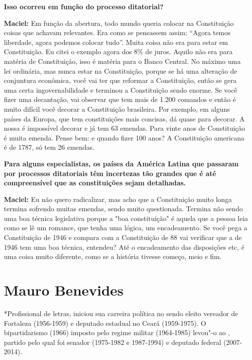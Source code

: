 \textbf{Isso ocorreu em função do processo ditatorial?}

\textbf{Maciel:} Em função da abertura, todo mundo queria colocar na
Constituição coisas que achavam relevantes. Era como se pensassem assim:
``Agora temos liberdade, agora podemos colocar tudo''. Muita coisa não
era para estar em Constituição. Eu citei o exemplo agora dos 8\% de
juros. Aquilo não era para matéria de Constituição, isso é matéria para
o Banco Central. No máximo uma lei ordinária, mas nunca estar na
Constituição, porque se há uma alteração de conjuntura econômica, você
vai ter que reformar a Constituição, então se gera uma certa
ingovernabilidade e terminou a Constituição sendo enorme. Se você fizer
uma decantação, vai observar que tem mais de 1.200 comandos e então é
muito difícil você decorar a Constituição brasileira. Por exemplo, em
alguns países da Europa, que tem constituições mais concisas, dá quase
para decorar. A nossa é impossível decorar e já tem 63 emendas. Para
vinte anos de Constituição é muita emenda. Pense bem: e quando fizer 100
anos? A Constituição americana é de 1787, só tem 26 emendas.

\textbf{Para alguns especialistas, os países da América Latina que
passaram por processos ditatoriais têm incertezas tão grandes que é até
compreensível que as constituições sejam detalhadas.}

\textbf{Maciel:} Eu não quero radicalizar, mas acho que a Constituição
muito longa termina sofrendo muitas emendas, sendo muito questionada.
Termina não sendo uma boa técnica legislativa porque a "boa
constituição" é aquela que a pessoa leia como se lê um romance, que
tenha uma lógica, um encadeamento. Se você pega a Constituição de 1946 e
compara com a Constituição de 88 vai verificar que a de 1946 tem uma boa
técnica, entendeu? Até o encadeamento das disposições etc, é uma coisa
muito diferente, como se a história tivesse começo, meio e fim.

\chapter{Mauro Benevides}

*Profissional de letras, iniciou sua carreira política no  sendo
eleito vereador de Fortaleza (1956-1959) e deputado estadual no Ceará
(1959-1975). O bipartidarismo (1966) imposto pelo regime militar
(1964-1985) levou"-o ao , partido pelo qual foi senador (1975-1982 e
1987-1994) e deputado federal (2007-2014).

